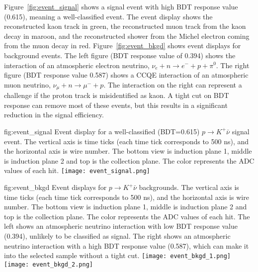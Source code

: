 
Figure~\ref{fig:event_signal} shows a signal event with high BDT response value (0.615), meaning a well-classified event. The event display shows the reconstructed kaon track in green, the reconstructed muon track from the kaon decay in maroon, and the reconstructed shower from the Michel electron coming from the muon decay in red. Figure~\ref{fig:event_bkgd} shows event displays for background events.  The left figure (BDT response value of 0.394) shows the interaction of an atmospheric electron neutrino, $\nu_{e}+n\rightarrow e^{-}+p+\pi^{0}$. The right figure (BDT response value 0.587) shows a CCQE interaction of an atmospheric muon neutrino, $\nu_{\mu}+n \rightarrow \mu^{-}+p$. The interaction on the right can represent a challenge if the proton track is misidentified as kaon. A tight cut on BDT response can remove most of these events, but this results in a significant reduction in the signal efficiency.


\begin{dunefigure}
{fig:event_signal}
{Event display for a well-classified (BDT=0.615) $p\rightarrow K^{+} \bar{\nu}$ signal event.  The vertical axis is time ticks (each time tick corresponds to 500 ns), and the horizontal axis is wire number. The bottom view is induction plane 1, middle is induction plane 2 and top is the collection plane. The color represents the ADC values of each hit.}
\texttt{[image: event\_signal.png]}
\end{dunefigure} 

\begin{dunefigure}
{fig:event_bkgd}
{Event displays for $p\rightarrow K^{+} \bar{\nu}$ backgrounds.  The vertical axis is time ticks (each time tick corresponds to 500 ns), and the horizontal axis is wire number. The bottom view is induction plane 1, middle is induction plane 2 and top is the collection plane. The color represents the ADC values of each hit. The left shows an atmospheric neutrino interaction with low BDT response value (0.394), unlikely to be classified as signal. The right shows an atmospheric neutrino interaction with a high BDT response value (0.587), which can make it into the selected sample without a tight cut.}
\texttt{[image: event\_bkgd\_1.png]}
\texttt{[image: event\_bkgd\_2.png]}
\end{dunefigure}

